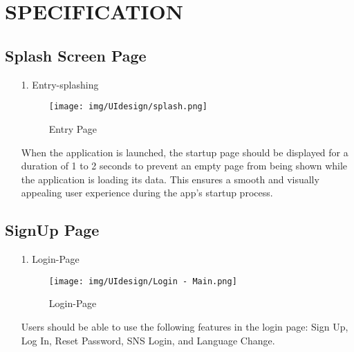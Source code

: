 \documentclass[conference]{IEEEtran}
\begin{document}
\begin{enumerate}
\begin{table}
\begin{tabular}{|p{1.2cm}|p{1.2cm}|p{5.2cm}|}
    \hline
    \end{tabular}
    \\ \\ \\ \\ \\ \\ \\ \\ \\ \\ \\ \\ 

\end{table}

\end{enumerate}
\clearpage


\section{SPECIFICATION}

\subsection{Splash Screen Page}
\begin{enumerate}
    \item[1.] Entry-splashing
    \begin{figure}[h]
\hspace{1.5cm}
\centering
\begin{minipage}{0.4\columnwidth}
    \texttt{[image: img/UIdesign/splash.png]}
    \caption{Entry Page}
\end{minipage}
\end{figure}
    
    When the application is launched, the startup page should be displayed for a duration of 1 to 2 seconds to prevent an empty page from being shown while the application is loading its data. This ensures a smooth and visually appealing user experience during the app’s startup process. 
\end{enumerate}

\subsection{SignUp Page}

\begin{enumerate}
    \item[1.] Login-Page
\begin{figure}[h]
\hspace{1.5cm}
\centering
\begin{minipage}{0.4\columnwidth}
    \texttt{[image: img/UIdesign/Login - Main.png]}
    \caption{Login-Page}
\end{minipage}
\end{figure}
    
    Users should be able to use the following features in the login page: Sign Up, Log In, Reset Password, SNS Login, and Language Change. \\
\end{enumerate}
\end{document}
